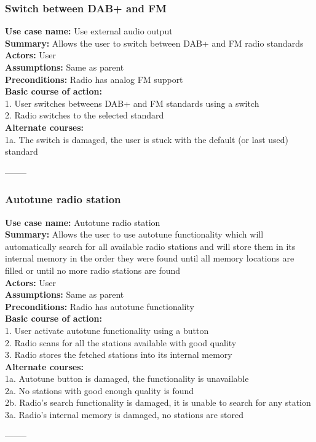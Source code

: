 \documentclass[11pt]{article}
\begin{document}
\subsubsection{Switch between DAB+ and FM}
\textbf{Use case name:} Use external audio output\\
\textbf{Summary:} Allows the user to switch between DAB+ and FM radio standards\\
\textbf{Actors:} User\\
\textbf{Assumptions:} Same as parent\\
\textbf{Preconditions:} Radio has analog FM support\\
\textbf{Basic course of action:}\\
1. User switches betweens DAB+ and FM standards using a switch\\
2. Radio switches to the selected standard\\
\textbf{Alternate courses:}\\
1a. The switch is damaged, the user is stuck with the default (or last used) standard
\begin{center}--------\end{center}

\subsubsection{Autotune radio station}
\textbf{Use case name:} Autotune radio station\\
\textbf{Summary:} Allows the user to use autotune functionality which will automatically search
for all available radio stations and will store them in its internal memory in the order they were found  until all memory locations are filled or until no more radio stations are found\\
\textbf{Actors:} User\\
\textbf{Assumptions:} Same as parent\\
\textbf{Preconditions:} Radio has autotune functionality\\
\textbf{Basic course of action:}\\
1. User activate autotune functionality using a button\\
2. Radio scans for all the stations available with good quality\\
3. Radio stores the fetched stations into its internal memory\\
\textbf{Alternate courses:}\\
1a. Autotune button is damaged, the functionality is unavailable\\
2a. No stations with good enough quality is found\\
2b. Radio's search functionality is damaged, it is unable to search for any station\\
3a. Radio's internal memory is damaged, no stations are stored
\begin{center}--------\end{center}
\end{document}
